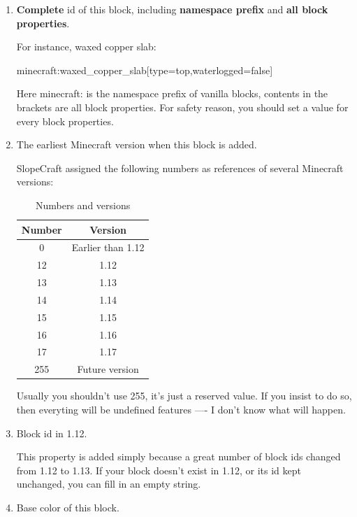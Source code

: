 \documentclass{article}
\begin{document}
   \begin{enumerate}
       \item \textbf{Complete} id of this block, including \textbf{namespace prefix} and \textbf{all block properties}.
       
       For instance, waxed copper slab:
       
       minecraft:waxed\_copper\_slab[type=top,waterlogged=false]

       Here minecraft: is the namespace prefix of vanilla blocks, contents in the brackets are all block properties. For safety reason, you should set a value for every block properties.

       \item The earliest Minecraft version when this block is added.

       SlopeCraft assigned the following numbers as references of several Minecraft versions:
       \begin{table}[h]
        \centering
        \caption{Numbers and versions}
        \label{VerAndRealVer}
        \begin{tabular}{cc}\hline
            Number & Version \\ \hline
            0 & Earlier than 1.12 \\
            12 & 1.12 \\
            13 & 1.13 \\
            14 & 1.14 \\
            15 & 1.15 \\
            16 & 1.16 \\
            17 & 1.17 \\
            255 & Future version \\
            \hline            
        \end{tabular}
       \end{table}

   Usually you shouldn't use 255, it's just a reserved value. If you insist to do so, then everyting will be undefined features ---- I don't know what will happen.

   \item Block id in 1.12.
   
   This property is added simply because a great number of block ids changed from 1.12 to 1.13. If your block doesn't exist in 1.12, or its id kept unchanged, you can fill in an empty string.
   
   \item Base color of this block.
   

\end{enumerate}
\end{document}
